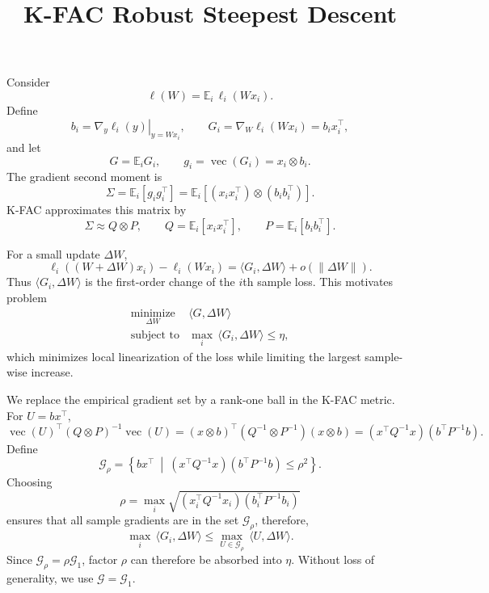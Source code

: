 \documentclass[11pt]{article}
\title{K-FAC Robust Steepest Descent} \author{}
\date{}
\theoremstyle{plain}
\theoremstyle{definition}
\theoremstyle{remark}
\begin{document}
\maketitle

Consider
\[
    \ell(W)=\mathbb{E}_i\,\ell_i(Wx_i).
\]
Define
\[
    b_i
    =
    \left.\nabla_y\ell_i(y)\right|_{y=Wx_i},
    \qquad
    G_i=\nabla_W\ell_i(Wx_i)=b_i x_i^\top,
\]
and let
\[
    G=\mathbb{E}_i G_i,
    \qquad
    g_i=\operatorname{vec}(G_i)=x_i\otimes b_i.
\]
The gradient second moment is
\[
    \Sigma
    =
    \mathbb{E}_i[g_i g_i^\top]
    =
    \mathbb{E}_i
    \left[
        (x_i x_i^\top)\otimes(b_i b_i^\top)
    \right].
\]
K-FAC approximates this matrix by
\[
    \Sigma\approx Q\otimes P,
    \qquad
    Q=\mathbb{E}_i[x_i x_i^\top],
    \qquad
    P=\mathbb{E}_i[b_i b_i^\top].
\]

For a small update $\Delta W$,
\[
    \ell_i((W+\Delta W)x_i)-\ell_i(Wx_i)
    =
    \langle G_i,\Delta W\rangle
    +o(\|\Delta W\|).
\]
Thus $\langle G_i,\Delta W\rangle$ is the first-order change of the
$i$th sample loss. This motivates problem
\[
\begin{array}{ll}
\underset{\Delta W}{\operatorname{minimize}}
    & \langle G,\Delta W\rangle \\
\operatorname{subject\ to}
    & \displaystyle
      \max_i \,\langle G_i,\Delta W\rangle\leq\eta ,
\end{array}
\]
which minimizes local linearization of the loss while limiting the
largest sample-wise increase.

We replace the empirical gradient set
by a rank-one ball in the K-FAC metric. 
For $U=bx^\top$,
\[
\operatorname{vec}(U)^\top
(Q\otimes P)^{-1}
\operatorname{vec}(U)
=
(x\otimes b)^\top
(Q^{-1}\otimes P^{-1})
(x\otimes b) =
(x^\top Q^{-1}x)(b^\top P^{-1}b).
\]
Define
\[
    \mathcal G_\rho
    =
    \left\{
        bx^\top ~\middle|~
        (x^\top Q^{-1}x)(b^\top P^{-1}b)\leq\rho^2
    \right\}.
\]
Choosing
\[
\rho
=
\max_i
\sqrt{
    (x_i^\top Q^{-1}x_i)
    (b_i^\top P^{-1}b_i)
}
\]
ensures that all sample gradients are in the set $\mathcal G_\rho$, therefore,
\[
\max_i \, \langle G_i,\Delta W\rangle
\leq
\max_{U\in\mathcal G_\rho} \,
\langle U,\Delta W\rangle.
\]
Since $\mathcal G_\rho=\rho\mathcal G_1$,
factor $\rho$ can therefore be absorbed into $\eta$. Without
loss of generality, we use $\mathcal G=\mathcal G_1$.
\end{document}
